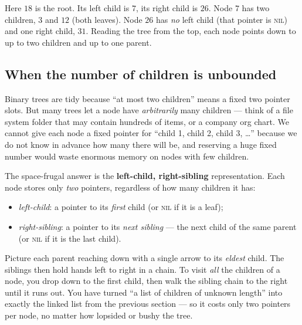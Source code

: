 \begin{center}
\end{center}

Here $18$ is the root. Its left child is $7$, its right child is $26$. Node $7$ has two children, $3$ and $12$ (both leaves). Node $26$ has \emph{no} left child (that pointer is \textsc{nil}) and one right child, $31$. Reading the tree from the top, each node points down to up to two children and up to one parent.

\subsection{When the number of children is unbounded}

Binary trees are tidy because ``at most two children'' means a fixed two pointer slots. But many trees let a node have \emph{arbitrarily} many children --- think of a file system folder that may contain hundreds of items, or a company org chart. We cannot give each node a fixed pointer for ``child 1, child 2, child 3, \dots'' because we do not know in advance how many there will be, and reserving a huge fixed number would waste enormous memory on nodes with few children.

The space-frugal answer is the \textbf{left-child, right-sibling} representation. Each node stores only \emph{two} pointers, regardless of how many children it has:
\begin{itemize}
  \item \emph{left-child}: a pointer to its \emph{first} child (or \textsc{nil} if it is a leaf);
  \item \emph{right-sibling}: a pointer to its \emph{next sibling} --- the next child of the same parent (or \textsc{nil} if it is the last child).
\end{itemize}

\begin{intuitionbox}
Picture each parent reaching down with a single arrow to its \emph{eldest} child. The siblings then hold hands left to right in a chain. To visit \emph{all} the children of a node, you drop down to the first child, then walk the sibling chain to the right until it runs out. You have turned ``a list of children of unknown length'' into exactly the linked list from the previous section --- so it costs only two pointers per node, no matter how lopsided or bushy the tree.
\end{intuitionbox}

